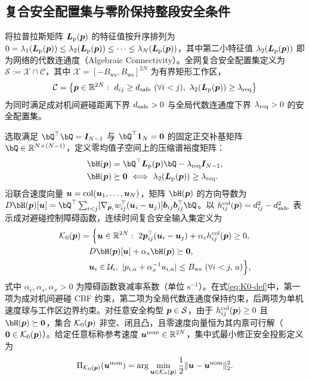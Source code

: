 \subsection{复合安全配置集与零阶保持整段安全条件}
将拉普拉斯矩阵 $\boldsymbol{L}_{\mathrm{p}}(\boldsymbol{p})$ 的特征值按升序排列为 $0=\lambda_1(\boldsymbol{L}_{\mathrm{p}}(\boldsymbol{p}))\le\lambda_2(\boldsymbol{L}_{\mathrm{p}}(\boldsymbol{p}))\le\cdots\le\lambda_N(\boldsymbol{L}_{\mathrm{p}}(\boldsymbol{p}))$，其中第二小特征值 $\lambda_2(\boldsymbol{L}_{\mathrm{p}}(\boldsymbol{p}))$ 即为网络的代数连通度（Algebraic Connectivity）。全网复合安全配置集定义为 $\mathcal S:=\mathcal X\cap\mathcal C$，其中 $\mathcal X=[-B_{\mathrm{ws}},B_{\mathrm{ws}}]^{2N}$ 为有界矩形工作区，
\begin{equation}
 \mathcal C=\big\{\bp\in\mathbb R^{2N}:\ d_{ij}\ge\ds\ (\forall i<j),\ \lambda_2(\bL(\bp))\ge\lr\big\}
 \label{eq:safe-set}
\end{equation}
为同时满足成对机间避碰距离下界 $d_{\mathrm{safe}}>0$ 与全局代数连通度下界 $\lambda_{\mathrm{req}}>0$ 的安全配置集。

选取满足 $\bQ^{\top}\bQ=\I_{N-1}$ 与 $\bQ^{\top}\boldsymbol 1_N=\boldsymbol 0$ 的固定正交补基矩阵 $\bQ\in\mathbb R^{N\times(N-1)}$，定义零均值子空间上的压缩谱裕度矩阵：
\begin{equation}
\begin{split}
 \bH(\bp)&=\bQ^{\top}\bL(\bp)\bQ-\lr\I_{N-1},\\
 \bH(\bp)&\succeq\boldsymbol 0\ \Longleftrightarrow\ \lambda_2(\bL(\bp))\ge\lr.
\end{split}
 \label{eq:H-matrix}
\end{equation}
沿联合速度向量 $\boldsymbol{u}=\operatorname{col}(\boldsymbol{u}_1,\dots,\boldsymbol{u}_N)$，矩阵 $\bH(\bp)$ 的方向导数为 $D\bH(\bp)[\bu]=\bQ^{\top}\sum_{i<j}[\nabla_{\bp_i}w_{ij}^{\top}(\bu_i-\bu_j)]\boldsymbol b_{ij}\boldsymbol b_{ij}^{\top}\bQ$。以 $h_{ij}^{\mathrm{col}}(\boldsymbol{p})=d_{ij}^2-d_{\mathrm{safe}}^2$ 表示成对避碰控制障碍函数，连续时间复合安全输入集定义为
\begin{equation}
\begin{split}
 \mathcal K_0(\bp)&=\Big\{\bu\in\mathbb R^{2N}:\ 2\bp_{ij}^{\top}(\bu_i-\bu_j)+\alpha_c h_{ij}^{\mathrm{col}}(\bp)\ge 0,\\
 &\quad D\bH(\bp)[\bu]+\alpha_s\bH(\bp)\succeq\boldsymbol 0,\\
 &\quad \bu_i\in\mathcal U_i,\ |p_{i,a}+\alpha_x^{-1}u_{i,a}|\le B_{\mathrm{ws}}\ (\forall i<j,\,a)\Big\},
\end{split}\label{eq:K0-def}
\end{equation}
式中 $\alpha_c,\alpha_s,\alpha_x>0$ 为障碍函数衰减率系数（单位 $\mathrm s^{-1}$）。在式\eqref{eq:K0-def}中，第一项为成对机间避碰 CBF 约束，第二项为全局代数连通度保持约束，后两项为单机速度球与工作区边界约束。对任意安全构型 $\boldsymbol{p}\in\mathcal S$，由于 $h_{ij}^{\mathrm{col}}(\boldsymbol{p})\ge 0$ 且 $\bH(\bp)\succeq\boldsymbol 0$，集合 $\mathcal K_0(\boldsymbol{p})$ 非空、闭且凸，且零速度向量恒为其内禀可行解（$\boldsymbol 0\in\mathcal K_0(\boldsymbol{p})$）。给定任意标称参考速度 $\boldsymbol{u}^{\mathrm{nom}}\in\mathbb R^{2N}$，集中式最小修正安全投影定义为
\begin{equation}
 \Pi_{\mathcal K_0(\boldsymbol{p})}(\boldsymbol{u}^{\mathrm{nom}})=\arg\min_{\boldsymbol{u}\in\mathcal K_0(\boldsymbol{p})}\frac12\lVert\boldsymbol{u}-\boldsymbol{u}^{\mathrm{nom}}\rVert_2^2.
 \label{eq:central-proj}
\end{equation}

